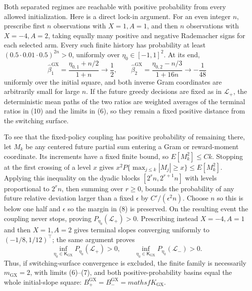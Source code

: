 Both separated regimes are reachable with positive probability from every
allowed initialization.  Here is a direct lock-in argument.  For an even
integer \(n\), prescribe first \(n\) observations with \(X=1,A=1\), and then
\(n\) observations with \(X=-4,A=2\), taking equally many positive and
negative Rademacher signs for each selected arm.  Every such finite history
has probability at least \((0.5\cdot0.01\cdot0.5)^{2n}>0\), uniformly over
\(\eta_0\in[-1,1]^2\).  At its end,
\[
 \widehat\beta^{\mathrm{GX}}_{1}=\frac{\eta_{0,1}+n/2}{1+n}
 \longrightarrow\frac12,
 \qquad
 \widehat\beta^{\mathrm{GX}}_{2}=\frac{\eta_{0,2}-n/3}{1+16n}
 \longrightarrow-\frac1{48}
 \tag{10}
\]
uniformly over the initial square, and both inverse Gram coordinates are
arbitrarily small for large \(n\).  If the future greedy decisions are fixed
as in \(\mathcal L_+\), the deterministic mean paths of the two ratios are
weighted averages of the terminal ratios in (10) and the limits in (6), so
they remain a fixed positive distance from the switching surface.

To see that the fixed-policy coupling has positive probability of remaining
there, let \(M_k\) be any centered future partial sum entering a Gram or
reward-moment coordinate.  Its increments have a fixed finite bound, so
\(E[M_k^2]\leq Ck\).  Stopping at the first crossing of a level \(x\) gives
\(x^2P\{\max_{j\leq k}|M_j|\geq x\}\leq E[M_k^2]\).  Applying this inequality
on the dyadic blocks \([2^rn,2^{r+1}n]\) with levels proportional to
\(2^rn\), then summing over \(r\geq0\), bounds the probability of any future
relative deviation larger than a fixed \(\epsilon\) by \(C'/(\epsilon^2n)\).
Choose \(n\) so this is below one half and \(\epsilon\) so the margin in
(8) is preserved.  On the resulting event the coupling never stops, proving
\(P_{\eta_0}(\mathcal L_+)>0\).  Prescribing instead \(X=-4,A=1\) and then
\(X=1,A=2\) gives terminal slopes converging uniformly to
\((-1/8,1/12)^\top\); the same argument proves
\[
 \inf_{\eta_0\in\mathsf K_{\mathrm{GX}}}
 P_{\eta_0}(\mathcal L_+)>0,
 \qquad
 \inf_{\eta_0\in\mathsf K_{\mathrm{GX}}}
 P_{\eta_0}(\mathcal L_-)>0.
 \tag{11}
\]
Thus, if switching-surface convergence is excluded, the finite family is
necessarily \(m_{\mathrm{GX}}=2\), with limits (6)--(7), and both
positive-probability basins equal the whole initial-slope square:
\(B^{\mathrm{GX}}_+=B^{\mathrm{GX}}_-=mathsf K_{\mathrm{GX}}\).

